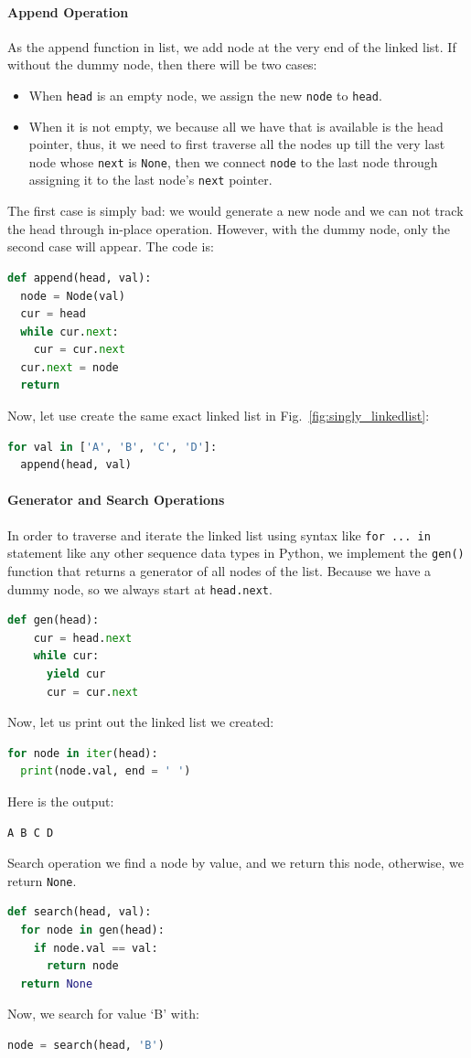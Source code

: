 \documentclass[../main.tex]{subfiles}
\begin{document}
\paragraph{Append Operation} As the append function in list, we add node at the very end of the linked list. If without the dummy node, then there will be two cases: 
\begin{itemize}
    \item When \texttt{head} is an empty node, we  assign the new \texttt{node} to \texttt{head}.
    \item When it is not empty, we because all we have that is available is the head pointer, thus, it we need to first traverse all the nodes up till the very last node whose \texttt{next} is \texttt{None}, then we connect \texttt{node} to the last node through assigning it to the last node's \texttt{next} pointer.
\end{itemize}
The first case is simply bad: we would generate a new node and we can not track the head through in-place operation. However, with the dummy node, only the second case will appear. The code is: 
\begin{lstlisting}[language=Python]
def append(head, val):
  node = Node(val)
  cur = head
  while cur.next:
    cur = cur.next
  cur.next = node
  return
\end{lstlisting}
Now, let use create the same exact linked list in Fig.~\ref{fig:singly_linkedlist}:
\begin{lstlisting}[language=Python]
for val in ['A', 'B', 'C', 'D']:
  append(head, val)
\end{lstlisting}
\paragraph{Generator and Search Operations} In order to traverse and iterate the linked list using syntax like \texttt{for ... in} statement like any other sequence data types in Python, we implement the \texttt{gen()} function that returns a generator of all nodes of the list. Because we have a dummy node, so we always start at \texttt{head.next}.
\begin{lstlisting}[language=Python]
def gen(head):
    cur = head.next
    while cur:
      yield cur
      cur = cur.next
\end{lstlisting}
Now, let us print out the linked list we created:
\begin{lstlisting}[language=Python]
for node in iter(head):
  print(node.val, end = ' ')
\end{lstlisting}
Here is the output:
\begin{lstlisting}[numbers=none]
A B C D 
\end{lstlisting}
Search operation we find a node by value, and we return this node, otherwise, we return \texttt{None}.
\begin{lstlisting}[language=Python]
def search(head, val):
  for node in gen(head):
    if node.val == val:
      return node
  return None
\end{lstlisting}
Now, we search for value `B' with:
\begin{lstlisting}[language=Python]
node = search(head, 'B')
\end{lstlisting}
\end{document}
